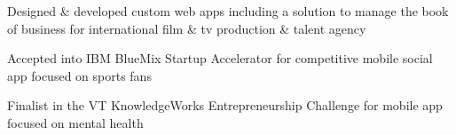 \documentclass[]{resume}
\begin{document}
\begin{minipage}[t]{0.55\textwidth}
\begin{tightemize}
\item Designed \& developed custom web apps including a solution to manage the book of business for international film \& tv production \& talent agency
\item Accepted into IBM BlueMix Startup Accelerator for competitive mobile social app focused on sports fans
\item Finalist in the VT KnowledgeWorks Entrepreneurship Challenge for mobile app focused on mental health 
\end{tightemize}
\sectionsep


\end{minipage} 
\end{document}

